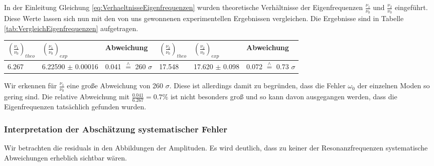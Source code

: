 In der Einleitung Gleichung \ref{eq:VerhaeltnisseEigenfrequenzen} wurden theoretische Verhältnisse der Eigenfrequenzen $\frac{\nu_1}{\nu_0}$ und $\frac{\nu_2}{\nu_0}$ eingeführt.
Diese Werte lassen sich nun mit den von uns gewonnenen experimentellen Ergebnissen vergleichen.
Die Ergebnisse sind in Tabelle \ref{tab:VergleichEigenfrequenzen} aufgetragen.

\minipage{\linewidth}
    \begin{center}
        \captionsetup{type=table}
        \begin{adjustbox}{max width=\linewidth, keepaspectratio}
            \begin{tabular}{llllll}
            \toprule
            $\left ( \frac{\nu_1}{\nu_0} \right )_{theo}$ & $\left ( \frac{\nu_1}{\nu_0} \right )_{exp}$ & Abweichung & $\left ( \frac{\nu_2}{\nu_0} \right )_{theo}$ & $\left ( \frac{\nu_2}{\nu_0} \right )_{exp}$ & Abweichung \\
            \midrule
            6.267 & 6.22590 $\pm$ 0.00016 & 0.041 $\overset{\wedge}{=}$ 260 $\sigma$ & 17.548 & 17.620 $\pm$ 0.098 & 0.072 $\overset{\wedge}{=}$ 0.73 $\sigma$ \\
            \bottomrule
            \end{tabular}
        \end{adjustbox}
        \label{tab:VergleichEigenfrequenzen}
    \end{center}
\endminipage

Wir erkennen für $\frac{\nu_1}{\nu_0}$ eine große Abweichung von 260 $\sigma$.
Diese ist allerdings damit zu begründen, dass die Fehler $\omega_0$ der einzelnen Moden so gering sind.
Die relative Abweichung mit $\frac{0.041}{6.267} = 0.7\%$ ist nicht besonders groß und so kann davon ausgegangen werden, dass die Eigenfrequenzen tatsächlich gefunden wurden.

\subsubsection*{Interpretation der Abschätzung systematischer Fehler}


Wir betrachten die residuals in den Abbildungen der Amplituden.
Es wird deutlich, dass zu keiner der Resonanzfrequenzen systematische Abweichungen erheblich sichtbar wären.

